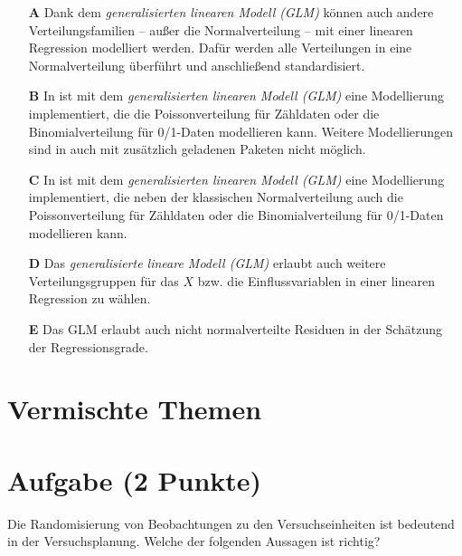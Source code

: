 \documentclass[a4paper, 9pt]{scrartcl}\usepackage[]{graphicx}\usepackage[]{xcolor}
\begin{document}
\begin{enumerate}
\item [\textbf{A} \msquare] Dank dem \textit{generalisierten linearen Modell (GLM)} können auch andere Verteilungsfamilien -- außer die Normalverteilung -- mit einer linearen Regression modelliert werden. Dafür werden alle Verteilungen in eine Normalverteilung überführt und anschließend standardisiert.
\item [\textbf{B} \msquare] In \Rlogo ist mit dem \textit{generalisierten linearen Modell (GLM)} eine Modellierung implementiert, die die Poissonverteilung für Zähldaten oder die Binomialverteilung für 0/1-Daten modellieren kann. Weitere Modellierungen sind in \Rlogo auch mit zusätzlich geladenen Paketen nicht möglich.
\item [\textbf{C} \msquare] In \Rlogo ist mit dem \textit{generalisierten linearen Modell (GLM)} eine Modellierung implementiert, die neben der klassischen Normalverteilung auch die Poissonverteilung für Zähldaten oder die Binomialverteilung für 0/1-Daten modellieren kann.
\item [\textbf{D} \msquare] Das \textit{generalisierte lineare Modell (GLM)} erlaubt auch weitere Verteilungsgruppen für das $X$ bzw. die Einflussvariablen in einer linearen Regression zu wählen.
\item [\textbf{E} \msquare] Das GLM erlaubt auch nicht normalverteilte Residuen in der Schätzung der Regressionsgrade.
\end{enumerate}
\section*{Vermischte Themen}  

\section{Aufgabe \hfill (2 Punkte)}

Die Randomisierung von Beobachtungen zu den Versuchseinheiten
ist bedeutend in der Versuchsplanung. Welche der folgenden Aussagen ist richtig?
\end{document}
